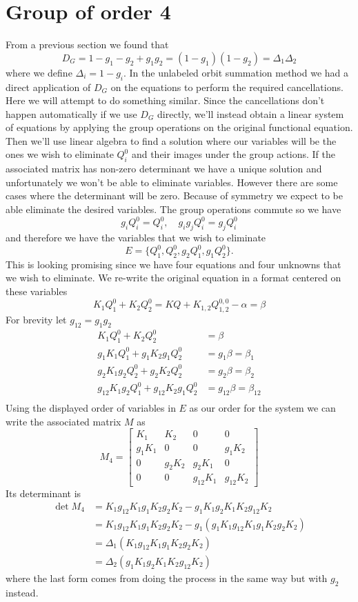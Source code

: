 \section{Group of order 4}
From a previous section we found that
\[
	D_G = 1-g_1-g_2+g_1g_2 = (1-g_1)(1-g_2) = \Delta_1\Delta_2
\]
where we define $\Delta_i = 1- g_i$. In the unlabeled orbit summation method we had a direct application of $D_G$ on the equations to perform the required cancellations. Here we will attempt to do something similar. Since the cancellations don't happen automatically if we use $D_G$ directly, we'll instead obtain a linear system of equations by applying the group operations on the original functional equation. Then we'll use linear algebra to find a solution where our variables will be the ones we wish to eliminate $Q_i^0$ and their images under the group actions. If the associated matrix has non-zero determinant we have a unique solution and unfortunately we won't be able to eliminate variables. However there are some cases where the determinant will be zero. Because of symmetry we expect to be able eliminate the desired variables. The group operations commute so we have
\[
	g_i Q_i^0 = Q_i^0,\quad g_ig_j Q_i^0 = g_j Q_i^0
\]
and therefore we have the variables that we wish to eliminate
\[
	E = \{Q_1^0,Q_2^0,g_2Q_1^0,g_1Q_2^0\}.
\]
This is looking promising since we have four equations and four unknowns that we wish to eliminate. We re-write the original equation in a format centered on these variables
\[
	 K_1 Q_1^0 +  K_2 Q_2^0 = KQ + K_{1,2}Q_{1,2}^{0,0} -\alpha = \beta
\]
For brevity let $g_{12} = g_1g_2$
\begin{align*}
	 K_1 Q_1^0 +  K_2 Q_2^0 &= \beta\\
	 g_1K_1 Q_1^0 + g_1K_2 g_1Q_2^0 &= g_1\beta = \beta_1\\
	 g_2K_1 g_2Q_2^0 + g_2K_2 Q_2^0 &= g_2\beta = \beta_2\\
	 g_{12}K_1 g_2Q_1^0 + g_{12}K_2 g_1Q_2^0 &= g_{12}\beta = \beta_{12}\\
\end{align*}
Using the displayed order of variables in $E$ as our order for the system we can write the associated matrix $M$ as
\[
	M_4 = \begin{bmatrix}
	K_1 & K_2 & 0 & 0 \\
	g_1 K_1 & 0 & 0 & g_1 K_2\\
	0 & g_2 K_2 & g_2 K_1 & 0\\
	0 & 0 & g_{12}K_1 & g_{12} K_2
	\end{bmatrix}
\]
Its determinant is
\begin{align*}
	\det M_4 &= K_1 g_{12}K_1 g_1K_2g_2K_2 -g_1K_1g_2K_1K_2g_{12}K_2\\
	& = K_1 g_{12}K_1 g_1K_2g_2K_2  -g_1(g_1K_1g_{12}K_1g_1K_2g_{2}K_2)\\
	&=\Delta_1  (K_1 g_{12}K_1 g_1K_2g_2K_2)\\
	&=\Delta_2 (g_1 K_1 g_2 K_1K_2 g_{12} K_2 )
\end{align*}
where the last form comes from doing the process in the same way but with $g_2$ instead.

